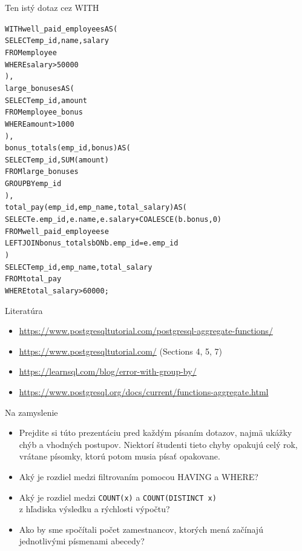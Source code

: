 \documentclass[12pt]{beamer}
\begin{document}
\begin{frame}[fragile]{Ten istý dotaz cez WITH}
\scriptsize
\begin{alltt}
\alert{WITH} well_paid_employees AS (
    SELECT emp_id, name, salary
    FROM employee
    WHERE salary > 50000
),
large_bonuses AS (
    SELECT emp_id, amount
    FROM employee_bonus
    WHERE amount > 1000
),
bonus_totals(emp_id, bonus) AS (
    SELECT emp_id, SUM(amount)
    FROM large_bonuses
    GROUP BY emp_id
),
total_pay(emp_id, emp_name, total_salary) AS (
    SELECT e.emp_id, e.name, e.salary + COALESCE(b.bonus, 0)
    FROM well_paid_employees e
        LEFT JOIN bonus_totals b ON b.emp_id = e.emp_id
)
SELECT emp_id, emp_name, total_salary
FROM total_pay
WHERE total_salary > 60000;
\end{alltt}
\end{frame}


\begin{frame}{Literatúra}
\begin{itemize}
\item {\scriptsize\url{https://www.postgresqltutorial.com/postgresql-aggregate-functions/}}
\item {\scriptsize\url{https://www.postgresqltutorial.com/} (Sections 4, 5, 7)}
\item {\scriptsize\url{https://learnsql.com/blog/error-with-group-by/}}
\item {\scriptsize\url{https://www.postgresql.org/docs/current/functions-aggregate.html}}
\end{itemize}
\end{frame}


\begin{frame}[fragile]{Na zamyslenie}
\begin{itemize}
\item Prejdite si túto prezentáciu pred každým písaním dotazov, najmä ukážky chýb a vhodných postupov.
    Niektorí študenti tieto chyby opakujú celý rok, vrátane písomky, ktorú potom musia písať opakovane.
\item Aký je rozdiel medzi filtrovaním pomocou HAVING a WHERE?
\item Aký je rozdiel medzi \verb|COUNT(x)| a \verb|COUNT(DISTINCT x)|\\
    z hľadiska výsledku a rýchlosti výpočtu?
\item Ako by sme spočítali počet zamestnancov, ktorých mená začínajú jednotlivými písmenami abecedy?
\end{itemize}
\end{frame}
\end{document}
